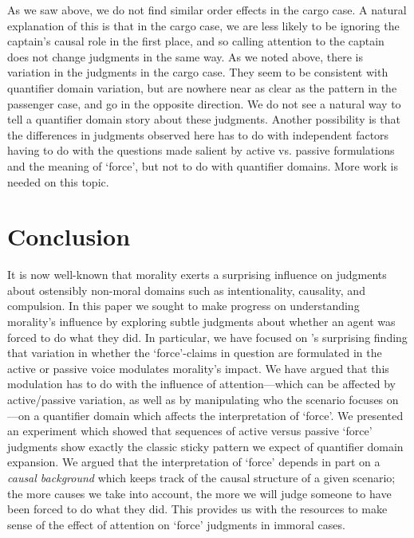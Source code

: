 \documentclass{salt}
\begin{document}
As we saw above, we do not find similar order effects in the cargo case. A natural explanation of this is that in the cargo case, we are less likely to be ignoring the captain's causal role in the first place, and so calling attention to the captain does not change judgments in the same way. As we noted above, there is variation in the judgments in the cargo case. They seem to be consistent with quantifier domain variation, but are nowhere near as clear as the pattern in the passenger case, and go in the opposite direction. We do not see a natural way to tell a quantifier domain story about these judgments. Another possibility is that the differences in judgments observed here has to do with independent factors having to do with the questions made salient by active vs. passive formulations and the meaning of `force', but not to do with quantifier domains. More work is needed on this topic.


\section{Conclusion} \label{sec:conclusion}

It is now well-known that morality exerts a surprising influence on judgments about ostensibly non-moral domains such as intentionality, causality, and compulsion. In this paper we sought to make progress on understanding morality's influence by exploring subtle judgments about whether an agent was forced to do what they did. In particular, we have focused on \citet{young2011paradox}'s surprising finding that variation in whether the `force'-claims in question are formulated in the active or passive voice modulates morality's impact. We have argued that this modulation has to do with the influence of attention---which can be affected by active/passive variation, as well as by manipulating who the scenario focuses on---on a quantifier domain which affects the interpretation of `force'. We presented an experiment which showed that sequences of active versus passive `force' judgments show exactly the classic sticky pattern we expect of quantifier domain expansion. We  argued that the interpretation of `force' depends in part on a \emph{causal background} which keeps track of the causal structure of a given scenario; the more causes we take into account, the more we will judge someone to have been forced to do what they did. This provides us with the resources to make sense of the effect of  attention on `force' judgments in immoral cases.
	
\end{document}
